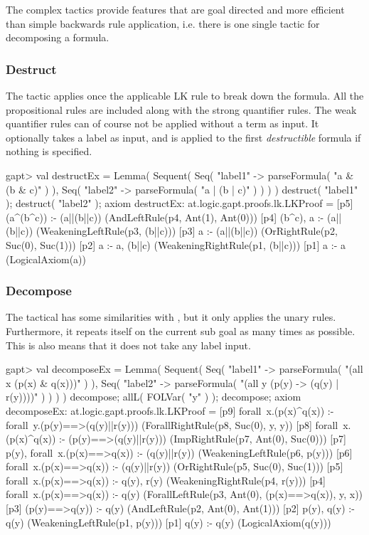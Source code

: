 \documentclass{article}
\newcommand{\cli}[1]{{\ttfamily {#1}}}
\begin{document}
The complex tactics provide features that are goal directed and more efficient than simple backwards rule application, i.e. there is one single tactic for decomposing a formula.

\subsubsection*{Destruct}

The \cli{destruct} tactic applies once the applicable LK rule to break down the formula. All the propositional rules are included along with the strong quantifier rules. The weak quantifier rules can of course not be applied without a term as input. It optionally takes a label as input, and is applied to the first \emph{destructible} formula if nothing is specified.

\begin{clilisting}
gapt> val destructEx = Lemma( Sequent( Seq( "label1" -> parseFormula( "a & (b & c)" ) ), Seq( "label2" -> parseFormula( "a | (b | c)" ) ) ) ) { destruct( "label1" ); destruct( "label2" ); axiom }
destructEx: at.logic.gapt.proofs.lk.LKProof =
[p5] (a^(b^c)) :- (a||(b||c))    (AndLeftRule(p4, Ant(1), Ant(0)))
[p4] (b^c), a :- (a||(b||c))    (WeakeningLeftRule(p3, (b||c)))
[p3] a :- (a||(b||c))    (OrRightRule(p2, Suc(0), Suc(1)))
[p2] a :- a, (b||c)    (WeakeningRightRule(p1, (b||c)))
[p1] a :- a    (LogicalAxiom(a))
\end{clilisting}

\subsubsection*{Decompose}

The \cli{decompose} tactical has some similarities with \cli{destruct}, but it only applies the unary rules. Furthermore, it repeats itself on the current sub goal as many times as possible. This is also means that it does not take any label input.

\begin{clilisting}
gapt> val decomposeEx = Lemma( Sequent( Seq( "label1" -> parseFormula( "(all x (p(x) & q(x)))" ) ), Seq( "label2" -> parseFormula( "(all y (p(y) -> (q(y) | r(y))))" ) ) ) ) { decompose; allL( FOLVar( "y" ) ); decompose; axiom }
decomposeEx: at.logic.gapt.proofs.lk.LKProof =
[p9] forall~x.(p(x)^q(x)) :- forall~y.(p(y)==>(q(y)||r(y)))    (ForallRightRule(p8, Suc(0), y, y))
[p8] forall~x.(p(x)^q(x)) :- (p(y)==>(q(y)||r(y)))    (ImpRightRule(p7, Ant(0), Suc(0)))
[p7] p(y), forall~x.(p(x)==>q(x)) :- (q(y)||r(y))    (WeakeningLeftRule(p6, p(y)))
[p6] forall~x.(p(x)==>q(x)) :- (q(y)||r(y))    (OrRightRule(p5, Suc(0), Suc(1)))
[p5] forall~x.(p(x)==>q(x)) :- q(y), r(y)    (WeakeningRightRule(p4, r(y)))
[p4] forall~x.(p(x)==>q(x)) :- q(y)    (ForallLeftRule(p3, Ant(0), (p(x)==>q(x)), y, x))
[p3] (p(y)==>q(y)) :- q(y)    (AndLeftRule(p2, Ant(0), Ant(1)))
[p2] p(y), q(y) :- q(y)    (WeakeningLeftRule(p1, p(y)))
[p1] q(y) :- q(y)    (LogicalAxiom(q(y)))
\end{clilisting}
\end{document}
